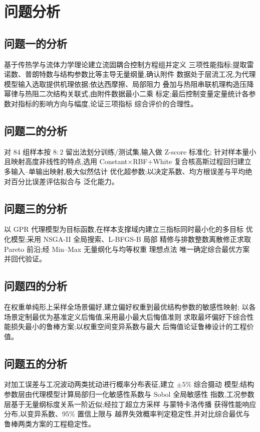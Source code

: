 \section{问题分析}

\subsection{问题一的分析}

基于传热学与流体力学理论\cite{White2016,Yang2006}建立流固耦合控制方程组并定义
三项性能指标;提取雷诺数、普朗特数与结构参数比等主导无量纲量,确认附件
数据处于层流工况,为代理模型输入选取提供机理依据;依达西摩擦、局部阻力
叠加与热阻串联机理构造压降幂律与热阻二次结构关联式,由附件数据最小二乘
标定;最后控制变量定量统计各参数对指标的影响方向与幅度,论证三项指标
综合评价的合理性。

\subsection{问题二的分析}

对 84 组样本按 $8:2$ 留出法划分训练/测试集,输入做 Z-score 标准化;
针对样本量小且映射高度非线性的特点,选用 Constant$\times$RBF+White
复合核高斯过程回归\cite{Rasmussen2006}建立多输入--单输出映射,极大似然估计
优化超参数;以决定系数、均方根误差与平均绝对百分比误差评估拟合与
泛化能力。

\subsection{问题三的分析}

以 GPR 代理模型为目标函数,在样本支撑域内建立三指标同时最小化的多目标
优化模型;采用 NSGA-II\cite{Deb2002} 全局搜索、L-BFGS-B\cite{Byrd1995,Chen2005} 局部
精修与排数整数离散修正求取 Pareto 前沿;经 Min--Max 无量纲化与均等权重
理想点法\cite{Hwang1981} 唯一确定综合最优方案并回代验证。

\subsection{问题四的分析}

在权重单纯形上采样全场景偏好,建立偏好权重到最优结构参数的敏感性映射;
以各场景定制最优为基准定义后悔值,采用最小最大后悔值准则\cite{Savage1951}
求取最坏偏好下综合性能损失最小的鲁棒方案;以权重空间变异系数与最大
后悔值论证鲁棒设计的工程价值。

\subsection{问题五的分析}

对加工误差与工况波动两类扰动进行概率分布表征,建立 $\pm5\%$ 综合摄动
模型;结构参数层由代理模型计算局部归一化敏感性系数与 Sobol 全局敏感性
指数\cite{Sobol2001},工况参数层基于无量纲标度关系一阶近似;经拉丁超立方采样
与蒙特卡洛传播\cite{McKay1979} 获得性能响应分布,以变异系数、95\% 置信上限与
越界失效概率判定稳定性,并对比综合最优与鲁棒两类方案的工程稳定性。
